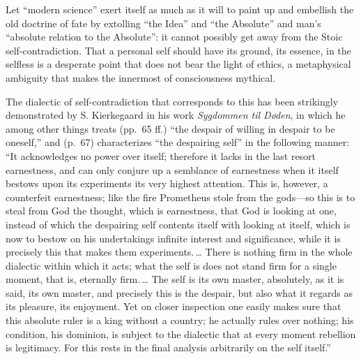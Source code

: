 \documentclass[12pt]{book}
\newcommand{\opage}[1]{\marginnote{\footnotesize\textit{[#1]}}}
\begin{document}
Let ``modern science'' exert itself as much as it will to paint up and
embellish the old doctrine of fate by extolling ``the Idea'' and ``the
Absolute'' and man's ``absolute relation to the Absolute'': it cannot
possibly get away from the Stoic self-contradiction. That a personal
self should have its ground, its essence, in the selfless is a desperate
point that does not bear the light of ethics, a metaphysical ambiguity
that makes the innermost of consciousness mythical.

The dialectic of self-contradiction that corresponds to this has been
strikingly demonstrated by S. Kierkegaard in his work
\emph{Sygdommen til Døden}, in which he among other things treats
(pp.~65 ff.) ``the despair of willing in despair to be oneself,'' and
(p.~67) characterizes ``the despairing self'' in the following manner:
``It acknowledges no power over itself; therefore it lacks in the last
resort earnestness, and can only conjure up a semblance of earnestness
when it itself bestows upon its experiments its very highest attention.
This is, however, a counterfeit earnestness; like the fire Prometheus
stole from the gods---so this is
\opage{213}\setcounter{footnote}{0}%
to steal from God the thought, which is earnestness, that God is looking
at one, instead of which the despairing self contents itself with
looking at itself, which is now to bestow on his undertakings infinite
interest and significance, while it is precisely this that makes them
experiments.\,\ldots{} There is nothing firm in the whole dialectic
within which it acts; what the self is does not stand firm for a single
moment, that is, eternally firm.\,\ldots{} The self is its own master,
absolutely, as it is said, its own master, and precisely this is the
despair, but also what it regards as its pleasure, its enjoyment. Yet
on closer inspection one easily makes sure that this absolute ruler is
a king without a country; he actually rules over nothing; his
condition, his dominion, is subject to the dialectic that at every
moment rebellion is legitimacy. For this rests in the final analysis
arbitrarily on the self itself.''
\end{document}
